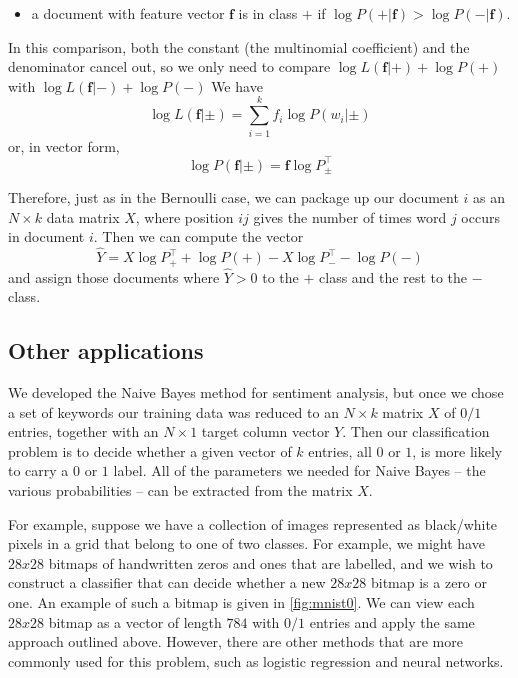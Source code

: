 \documentclass[
]{article}
\providecommand{\tightlist}{%
  \setlength{\itemsep}{0pt}\setlength{\parskip}{0pt}}
\begin{document}
\begin{itemize}
\tightlist
\item
  a document with feature vector \(\mathbf{f}\) is in class \(+\) if
  \(\log P(+|\mathbf{f})>\log P(-|\mathbf{f})\).
\end{itemize}

In this comparison, both the constant (the multinomial coefficient) and
the denominator cancel out, so we only need to compare
\(\log L(\mathbf{f}|+)+\log P(+)\) with
\(\log L(\mathbf{f}|-)+\log P(-)\) We have \[
\log L(\mathbf{f}|\pm) = \sum_{i=1}^{k} f_{i}\log P(w_{i}|\pm)
\] or, in vector form, \[
\log P(\mathbf{f}|\pm) = \mathbf{f}\log P_{\pm}^{\intercal}
\]

Therefore, just as in the Bernoulli case, we can package up our document
\(i\) as an \(N\times k\) data matrix \(X\), where position \(ij\) gives
the number of times word \(j\) occurs in document \(i\). Then we can
compute the vector \[
\hat{Y} = X\log P_{+}^{\intercal} + \log P(+)-X\log P_{-}^{\intercal} - \log P(-)
\] and assign those documents where \(\hat{Y}>0\) to the \(+\) class and
the rest to the \(-\) class.

\hypertarget{other-applications}{%
\subsection{Other applications}\label{other-applications}}

We developed the Naive Bayes method for sentiment analysis, but once we
chose a set of keywords our training data was reduced to an
\(N\times k\) matrix \(X\) of \(0/1\) entries, together with an
\(N\times 1\) target column vector \(Y\). Then our classification
problem is to decide whether a given vector of \(k\) entries, all \(0\)
or \(1\), is more likely to carry a \(0\) or \(1\) label. All of the
parameters we needed for Naive Bayes -- the various probabilities -- can
be extracted from the matrix \(X\).

For example, suppose we have a collection of images represented as
black/white pixels in a grid that belong to one of two classes. For
example, we might have \(28x28\) bitmaps of handwritten zeros and ones
that are labelled, and we wish to construct a classifier that can decide
whether a new \(28x28\) bitmap is a zero or one. An example of such a
bitmap is given in \cref{fig:mnist0}. We can view each \(28x28\) bitmap
as a vector of length \(784\) with \(0/1\) entries and apply the same
approach outlined above. However, there are other methods that are more
commonly used for this problem, such as logistic regression and neural
networks.
\end{document}
